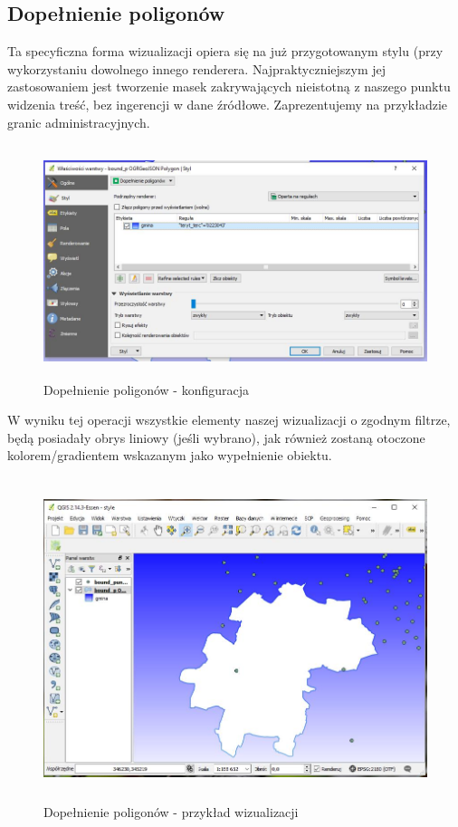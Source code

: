 \documentclass[12pt,a4paper]{book}
\begin{document}
\subsection{Dopełnienie poligonów}
Ta specyficzna forma wizualizacji opiera się na już przygotowanym stylu (przy wykorzystaniu dowolnego innego renderera. Najpraktyczniejszym jej zastosowaniem jest tworzenie masek zakrywających nieistotną z naszego punktu widzenia treść, bez ingerencji w dane źródłowe. Zaprezentujemy na przykładzie granic administracyjnych.



\begin{center}
\begin{figure}
\includegraphics[width=13cm,height=6.798cm]{007-dopelnienie-konf.jpg}
\caption{Dopełnienie poligonów - konfiguracja}
\end{figure}
\end{center}
W wyniku tej operacji wszystkie elementy naszej wizualizacji o zgodnym filtrze, będą posiadały obrys liniowy (jeśli wybrano), jak również zostaną otoczone kolorem/gradientem wskazanym jako wypełnienie obiektu.



\begin{center}
\begin{figure}
\includegraphics[width=13cm,height=9.398cm]{007-dopelnienie-wiz.jpg}
\caption{Dopełnienie poligonów - przykład wizualizacji}
\end{figure}
\end{center}
\end{document}
